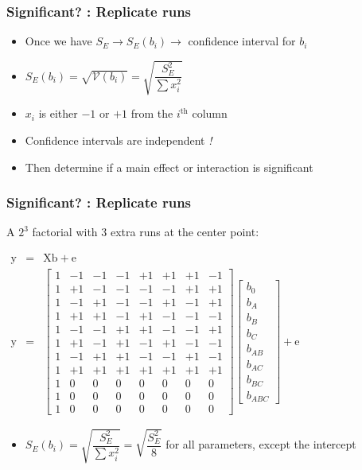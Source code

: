 \begin{frame}\frametitle{Significant? : Replicate runs}
	\begin{itemize}
		\item	Once we have $S_E \rightarrow S_E(b_i) \rightarrow$ confidence interval for $b_i$
		\item	$S_E(b_i) = \sqrt{\mathcal{V}\left(b_i\right)} = \sqrt{\dfrac{S_E^2}{\sum{x_i^2}}}$
		\item	$x_i$ is either $-1$ or $+1$ from the $i^\text{th}$ column
		\item	Confidence intervals are independent \emph{!}
		\item	Then determine if a main effect or interaction is significant
	\end{itemize}
	\vspace{12pt}
	{\color{myOrange}{So how do we get degrees of freedom to calculate \( S_E \)?}}
\end{frame}

\begin{frame}\frametitle{Significant? : Replicate runs}

	A $2^3$ factorial with 3 extra runs at the center point:

	$
	\begin{array}{rcl}
		\mathrm{y} &=& \mathrm{X} \mathrm{b} + \mathrm{e}\\
		\mathrm{y} &=&
		\begin{bmatrix}
			1 & -1 & -1 & -1 & +1 & +1 & +1 & -1\\
			1 & +1 & -1 & -1 & -1 & -1 & +1 & +1\\
			1 & -1 & +1 & -1 & -1 & +1 & -1 & +1\\
			1 & +1 & +1 & -1 & +1 & -1 & -1 & -1\\
			1 & -1 & -1 & +1 & +1 & -1 & -1 & +1\\
			1 & +1 & -1 & +1 & -1 & +1 & -1 & -1\\
			1 & -1 & +1 & +1 & -1 & -1 & +1 & -1\\
			1 & +1 & +1 & +1 & +1 & +1 & +1 & +1\\
			1 & 0 & 0 & 0 & 0 & 0 & 0 & 0\\
			1 & 0 & 0 & 0 & 0 & 0 & 0 & 0\\
			1 & 0 & 0 & 0 & 0 & 0 & 0 & 0
		\end{bmatrix}
		\begin{bmatrix}
			b_0 \\
			b_A \\
			b_B \\
			b_{C} \\
			b_{AB} \\
			b_{AC} \\
			b_{BC} \\
			b_{ABC}
		\end{bmatrix}
		+ \mathrm{e}
	\end{array}
	$
	\begin{itemize}
		\item	$S_E(b_i) = \sqrt{\dfrac{S_E^2}{\sum{x_i^2}}} = \sqrt{\dfrac{S_E^2}{8}} $ for all parameters, except the intercept
	\end{itemize}
\end{frame}

